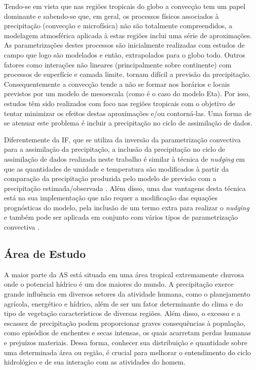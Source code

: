 Tendo-se em vista que nas regiões tropicais do globo a convecção tem um papel dominante e sabendo-se que, em geral, os processos físicos associados à precipitação (convecção e microfísica) não são totalmente compreendidos, a modelagem atmosférica aplicada à estas regiões inclui uma série de aproximações. As parametrizações destes processos são inicialmente realizadas com estudos de campo que logo são modelados e então, extrapolados para o globo todo. Outros fatores como interações não lineares (principalmente sobre continente) com processos de superfície e camada limite, tornam difícil a previsão da precipitação. Consequentemente a convecção tende a não se formar nos horários e locais previstos por um modelo de mesoescala (como é o caso do modelo Eta). Por isso, estudos têm sido realizados com foco nas regiões tropicais com o objetivo de tentar minimizar os efeitos destas aproximações e/ou contorná-las. Uma forma de se atenuar este problema é incluir a precipitação no ciclo de assimilação de dados.

Diferentemente da IF, que se utiliza da inversão da parametrização convectiva para a assimilação da precipitação, a inclusão da precipitação no ciclo de assimilação de dados realizada neste trabalho é similar à técnica de \textit{nudging} em que as quantidades de umidade e temperatura são modificados à partir da comparação da precipitação produzida pelo modelo de previsão com a precipitação estimada/observada \cite{carrbaldwin91}. Além disso, uma das vantagens desta técnica está na sua implementação que não requer a modificação das equações prognósticas do modelo, pela inclusão de um termo extra para realizar o \textit{nudging} e também pode ser aplicada em conjunto com vários tipos de parametrização convectiva \cite{rogersetal05}.

\subsection{Área de Estudo}

A maior parte da AS está situada em uma área tropical extremamente chuvosa onde o potencial hídrico é um dos maiores do mundo. A precipitação exerce grande influência em diversos setores da atividade humana, como o planejamento agrícola, energético e hídrico, além de ser um fator determinante do clima e do tipo de vegetação característicos de diversas regiões. Além disso, o excesso e a escassez de precipitação podem proporcionar graves consequências à população, como episódios de enchentes e secas intensas, os quais acarretam perdas humanas e prejuízos materiais. Dessa forma, conhecer sua distribuição e quantidade sobre uma determinada área ou região, é crucial para melhorar o entendimento do ciclo hidrológico e de sua interação com as atividades do homem.

